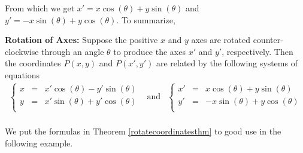 \documentclass{ximera}
\begin{document}
From which we get $x' = x \cos(\theta) + y\sin(\theta)$ and $y'=- x \sin(\theta) + y\cos(\theta)$.  To summarize, 



\begin{theorem} \label{rotatecoordinatesthm}  \textbf{Rotation of Axes:}  Suppose the positive $x$ and $y$ axes are rotated counter-clockwise through an angle $\theta$ to produce the axes $x'$ and $y'$, respectively.  Then the coordinates $P(x,y)$ and $P(x',y')$ are related by the following systems of equations
\[ \begin{array}{ccc}

\left\{  \begin{array}{rcl}x & = & x' \cos(\theta) - y' \sin(\theta) \\ y& = &  x'\sin(\theta) + y'\cos(\theta)  \\ \end{array} \right. &

\text{and}

&

\left\{ \begin{array}{rcl} x' & = & x \cos(\theta) + y \sin(\theta) \\ y' & = &  -x\sin(\theta) +y\cos(\theta)  \\ \end{array} \right.  

\\ \end{array} \]

\end{theorem}




We put the formulas in  Theorem \ref{rotatecoordinatesthm} to good use in the following example.
\end{document}
